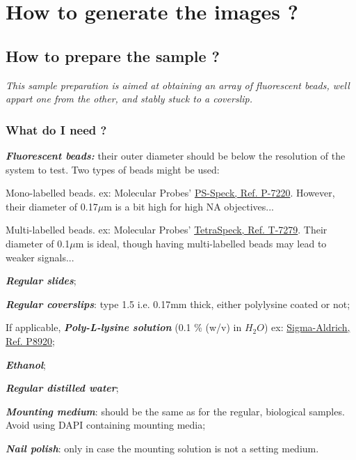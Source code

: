 \documentclass[a4paper, 11pt]{report}%
\begin{document}
\section{How to generate the images ?}
\label{sec:gpr-what}

\subsection{How to prepare the sample ?}
\label{sec:gpr-proto}

\textit{This sample preparation is aimed at obtaining an array of fluorescent beads, well appart one from the other, and stably stuck to a coverslip.}

\subsubsection{What do I need ?}
\label{sec:gpr-proto-what}

\begin{itemize*}
	\item \textbf{\textit{Fluorescent beads:}} their outer diameter should be below the resolution of the system to test. Two types of beads might be used:
		\begin{itemize*}
			\item Mono-labelled beads. ex: Molecular Probes' \href{http://probes.invitrogen.com/media/pis/mp07220.pdf}{PS-Speck, Ref. P-7220}. However, their diameter of 0.17$\mu$m is a bit high for high NA objectives...
			\item Multi-labelled beads. ex: Molecular Probes' \href{http://probes.invitrogen.com/media/pis/mp07279.pdf}{TetraSpeck, Ref. T-7279}. Their diameter of 0.1$\mu$m is ideal, though having multi-labelled beads may lead to weaker signals...
		\end{itemize*}
	\item \textbf{\textit{Regular slides}};
	\item \textbf{\textit{Regular coverslips}}: type 1.5 i.e. 0.17mm thick, either polylysine coated or not;
	\item If applicable, \textbf{\textit{Poly-L-lysine solution}} (0.1 \% (w/v) in $H_{2}O$) ex: \href{http://www.sigmaaldrich.com/etc/medialib/docs/Sigma/generalinformation2/p8920.Par.0001.File.tmp/p8920.pdf}{Sigma-Aldrich, Ref. P8920};
	\item \textbf{\textit{Ethanol}};
	\item \textbf{\textit{Regular distilled water}};
	\item \textbf{\textit{Mounting medium}}: should be the same as for the regular, biological samples. Avoid using DAPI containing mounting media;
	\item \textbf{\textit{Nail polish}}: only in case the mounting solution is not a setting medium.
\end{itemize*}
\end{document}
